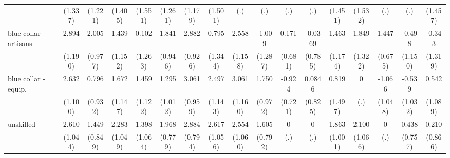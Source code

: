 {\begin{tabular}{l*{16}{c}}
                    &     (1.337)         &     (1.221)         &     (1.405)         &     (1.551)         &     (1.261)         &     (1.179)         &     (1.501)         &         (.)         &         (.)         &         (.)         &         (.)         &     (1.451)         &     (1.532)         &         (.)         &         (.)         &     (1.457)         \\
[1em]
blue collar - artisans&       2.894\sym{*}  &       2.005\sym{*}  &       1.439         &       0.102         &       1.841         &       2.882\sym{**} &       0.795         &       2.558\sym{*}  &      -1.009         &       0.171         &     -0.0369         &       1.463         &       1.849         &       1.447\sym{*}  &      -0.498         &      -0.343         \\
                    &     (1.190)         &     (0.977)         &     (1.152)         &     (1.263)         &     (0.946)         &     (0.926)         &     (1.344)         &     (1.158)         &     (1.287)         &     (0.681)         &     (0.785)         &     (1.174)         &     (1.322)         &     (0.675)         &     (1.150)         &     (1.319)         \\
[1em]
blue collar - equip.&       2.632\sym{*}  &       0.796         &       1.672         &       1.459         &       1.295         &       3.061\sym{**} &       2.497\sym{*}  &       3.061\sym{**} &       1.750         &      -0.924         &      0.0846         &       0.819         &           0         &      -1.066         &      -0.539         &       0.542         \\
                    &     (1.100)         &     (0.932)         &     (1.147)         &     (1.122)         &     (1.012)         &     (0.959)         &     (1.143)         &     (1.160)         &     (0.972)         &     (0.721)         &     (0.825)         &     (1.497)         &         (.)         &     (1.048)         &     (1.032)         &     (1.089)         \\
[1em]
unskilled           &       2.610\sym{*}  &       1.449         &       2.283\sym{*}  &       1.398         &       1.968\sym{*}  &       2.884\sym{***}&       2.617\sym{*}  &       2.554\sym{*}  &       1.605\sym{*}  &           0         &           0         &       1.863         &       2.100\sym{*}  &           0         &       0.438         &       0.210         \\
                    &     (1.044)         &     (0.849)         &     (1.049)         &     (1.064)         &     (0.779)         &     (0.794)         &     (1.056)         &     (1.060)         &     (0.792)         &         (.)         &         (.)         &     (1.001)         &     (1.066)         &         (.)         &     (0.757)         &     (0.866)         \\

\end{tabular}}
